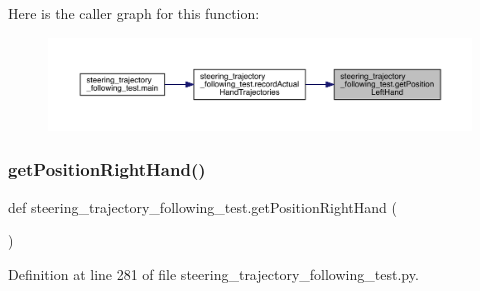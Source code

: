 Here is the caller graph for this function\+:\nopagebreak
\begin{figure}[H]
\begin{center}
\leavevmode
\includegraphics[width=350pt]{namespacesteering__trajectory__following__test_a0f76013b90d9b49c61ca4054512e5852_icgraph}
\end{center}
\end{figure}
\mbox{\label{namespacesteering__trajectory__following__test_a69336b47326639e5108afdb6eec04bfa}} 
\subsubsection{\texorpdfstring{getPositionRightHand()}{getPositionRightHand()}}
{\footnotesize\ttfamily def steering\+\_\+trajectory\+\_\+following\+\_\+test.\+get\+Position\+Right\+Hand (\begin{DoxyParamCaption}{ }\end{DoxyParamCaption})}



Definition at line 281 of file steering\+\_\+trajectory\+\_\+following\+\_\+test.\+py.


